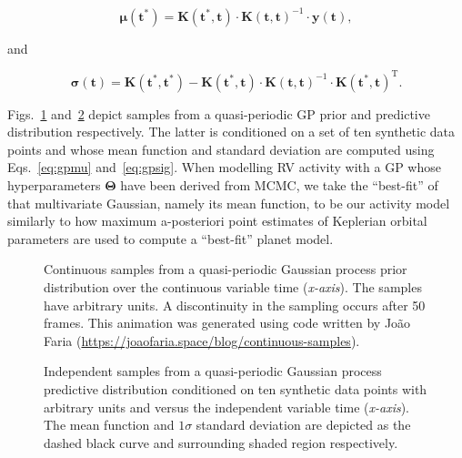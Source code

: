 \begin{equation}
  \boldsymbol{\mu}(\mathbf{t}^*) = \mathbf{K}(\mathbf{t}^*,\mathbf{t}) \cdot
  \mathbf{K}(\mathbf{t},\mathbf{t})^{-1} \cdot \mathbf{y}(\mathbf{t}),
  \label{eq:gpmu}
\end{equation}

\noindent and

\begin{equation}
  \boldsymbol{\sigma}(\mathbf{t}) = \mathbf{K}(\mathbf{t}^*,\mathbf{t}^*) -
  \mathbf{K}(\mathbf{t}^*,\mathbf{t}) \cdot \mathbf{K}(\mathbf{t},\mathbf{t})^{-1}
  \cdot \mathbf{K}(\mathbf{t}^*,\mathbf{t})^{\text{T}}.
  \label{eq:gpsig}
\end{equation}

Figs.~\ref{fig:gpsamples} and~\ref{fig:gpsamplespred} depict samples from a
quasi-periodic GP prior and predictive distribution respectively. The latter is
conditioned on a set of ten synthetic data points and whose mean function and
standard deviation are computed using Eqs.~\ref{eq:gpmu} and~\ref{eq:gpsig}. When
modelling RV activity with a GP whose hyperparameters $\boldsymbol{\Theta}$ have
been derived from MCMC, we take the ``best-fit'' of that multivariate Gaussian, namely
its mean function, to be our activity model similarly to how maximum a-posteriori
point estimates of Keplerian orbital parameters are used to compute a ``best-fit''
planet model. \\

\begin{figure}
  \centering
  \caption[Samples from a quasi-periodic Gaussian process prior distribution.]
          {Continuous samples from a quasi-periodic Gaussian process prior distribution
	    over the continuous variable time (\emph{x-axis}). The samples have arbitrary 
 	    units. A discontinuity in the sampling occurs after 50 frames. This animation was
            generated using code written by Jo\~ao
            Faria (\url{https://joaofaria.space/blog/continuous-samples}).}
  \label{fig:gpsamples}
\end{figure}

\begin{figure}
  \centering
  \caption[Samples from a quasi-periodic Gaussian process predictive distribution.]
          {Independent samples from a quasi-periodic Gaussian process predictive distribution
            conditioned on ten synthetic data points with arbitrary units and
            versus the independent variable time (\emph{x-axis}). The mean function and
            $1\sigma$ standard deviation are depicted as the dashed black curve and surrounding
          shaded region respectively.}
  \label{fig:gpsamplespred}
\end{figure}


